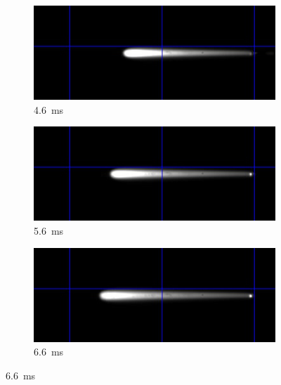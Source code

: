 \begin{figure}[h]
\begin{subfigure}[t]{0.47\textwidth}
        \end{subfigure}
        \hfill
        \begin{subfigure}[t]{0.47\textwidth}
            \centering
            \includegraphics[width=\textwidth]{assets/5 results/1msFrames/46.jpg}
            \caption{\qty{4.6}{ms}}
            \label{fig:growth_frames_46}
        \end{subfigure}
        \hfill
        \begin{subfigure}[t]{0.47\textwidth}
            \centering
            \includegraphics[width=\textwidth]{assets/5 results/1msFrames/56.jpg}
            \caption{\qty{5.6}{ms}}
            \label{fig:growth_frames_56}
        \end{subfigure}
        \hfill
        \begin{subfigure}[t]{0.47\textwidth}
            \centering
            \includegraphics[width=\textwidth]{assets/5 results/1msFrames/66.jpg}
            \caption{\qty{6.6}{ms}}
            \label{fig:growth_frames_66}

\end{subfigure}
\end{figure}
